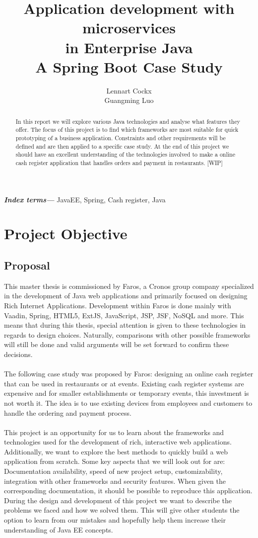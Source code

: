 \documentclass[12pt]{article}
\title{Application development with microservices\\ in Enterprise Java\\ A Spring Boot Case Study}
\author{Lennart Cockx\\Guangming Luo}
\providecommand{\keywords}[1]{\textbf{\textit{Index terms---}} #1}
\begin{document}
\maketitle
\newpage
\tableofcontents
\newpage

\begin{abstract}
\noindent In this report we will explore various Java technologies and analyse what features they offer. The focus of this project is to find which frameworks are most suitable for quick prototyping of a business application. Constraints and other requirements will be defined and are then applied to a specific case study. At the end of this project we should have an excellent understanding of the technologies involved to make a online cash register application that handles orders and payment in restaurants. [WIP]
\end{abstract}
\keywords{JavaEE, Spring, Cash register, Java}

\section{Project Objective}
\subsection{Proposal}
This master thesis is commissioned by Faros, a Cronos group company specialized in the development of Java web applications and primarily focused on designing Rich Internet Applications. Development within Faros is done mainly with Vaadin, Spring, HTML5, ExtJS, JavaScript, JSP, JSF, NoSQL and more. This means that during this thesis, special attention is given to these technologies in regards to design choices. Naturally, comparisons with other possible frameworks will still be done and valid arguments will be set forward to confirm these decisions.
\\\\
The following case study was proposed by Faros: designing an online cash register that can be used in restaurants or at events. Existing cash register systems are expensive and for smaller establishments or temporary events, this investment is not worth it. The idea is to use existing devices from employees and customers to handle the ordering and payment process.
\\\\
This project is an opportunity for us to learn about the frameworks and technologies used for the development of rich, interactive web applications. Additionally, we want to explore the best methods to quickly build a web application from scratch. Some key aspects that we will look out for are: Documentation availability, speed of new project setup, customizability, integration with other frameworks and security features. When given the corresponding documentation, it should be possible to reproduce this application. During the design and development of this project we want to describe the problems we faced and how we solved them. This will give other students the option to learn from our mistakes and hopefully help them increase their understanding of Java EE concepts. 
\end{document}
